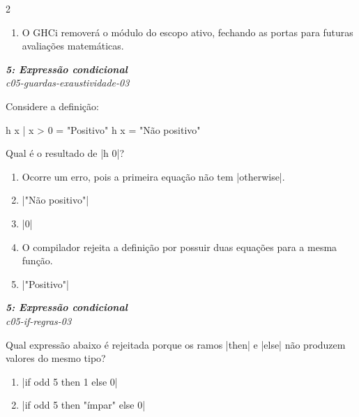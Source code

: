 \documentclass[a4paper,10pt,brazil]{article}
\begin{document}
\begin{multicols}{2}
\begin{enumerate}
  \item O GHCi removerá o módulo do escopo ativo, fechando as portas para futuras avaliações matemáticas.


\end{enumerate}

\begin{flushright}
  \footnotesize
  \textit{\textbf{5: Expressão condicional}}\\
  \textit{c05-guardas-exaustividade-03}\\

\end{flushright}
Considere a definição:
\begin{haskellcode}
h x
  | x > 0 = "Positivo"
h x = "Não positivo"
\end{haskellcode}
Qual é o resultado de \haskellinline|h 0|?

\begin{enumerate}
  \item Ocorre um erro, pois a primeira equação não tem \haskellinline|otherwise|.

  \item \haskellinline|"Não positivo"|

  \item \haskellinline|0|

  \item O compilador rejeita a definição por possuir duas equações para a mesma função.

  \item \haskellinline|"Positivo"|


\end{enumerate}

\begin{flushright}
  \footnotesize
  \textit{\textbf{5: Expressão condicional}}\\
  \textit{c05-if-regras-03}\\

\end{flushright}
Qual expressão abaixo é rejeitada porque os ramos \haskellinline|then| e \haskellinline|else| não produzem valores do mesmo tipo?

\begin{enumerate}
  \item \haskellinline|if odd 5 then 1 else 0|

  \item \haskellinline|if odd 5 then "ímpar" else 0|


\end{enumerate}
\end{multicols}
\end{document}
